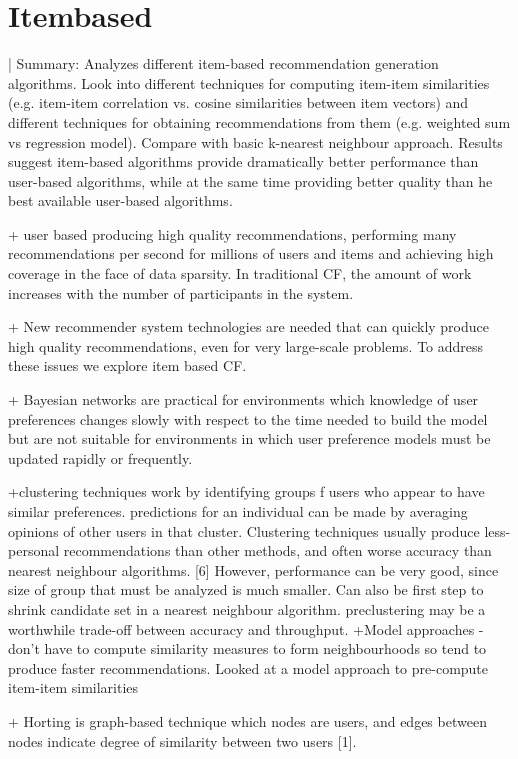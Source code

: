 \section{Itembased}
\cite{itembased}
\citeyear{itembased}|
Summary: 
Analyzes different item-based recommendation generation algorithms. Look into different techniques for computing item-item similarities (e.g. item-item correlation vs. cosine similarities between item vectors) and different techniques for obtaining recommendations from them (e.g. weighted sum vs regression model). Compare with basic k-nearest neighbour approach. Results suggest item-based algorithms provide dramatically better performance than user-based algorithms, while at the same time providing better quality than he best available user-based algorithms. 

+ user based producing high quality recommendations, performing many recommendations per second for millions of users and items and achieving high coverage in the face of data sparsity. In traditional CF, the amount of work increases with the number of participants in the system. 

+ New recommender system technologies are needed that can quickly produce high quality recommendations, even for very large-scale problems. To address these issues we explore item based CF. 

+ Bayesian networks are practical for environments which knowledge of user preferences changes slowly with respect to the time needed to build the model but are not suitable for environments in which user preference models must be updated rapidly or frequently.

+clustering techniques work by identifying groups f users who appear to have similar preferences. predictions for an individual can be made by averaging opinions of other users in that cluster. Clustering techniques usually produce less-personal recommendations than other methods, and often worse accuracy than nearest neighbour algorithms. [6] However, performance can be very good, since size of group that must be analyzed is much smaller. Can also be first step to shrink candidate set in a nearest neighbour algorithm. preclustering may be a worthwhile trade-off between accuracy and throughput. 
+Model approaches - don't have to compute similarity measures to form neighbourhoods so tend to produce faster recommendations. Looked at a model approach to pre-compute item-item similarities

+ Horting is graph-based technique which nodes are users, and edges between nodes indicate degree of similarity between two users [1]. 

